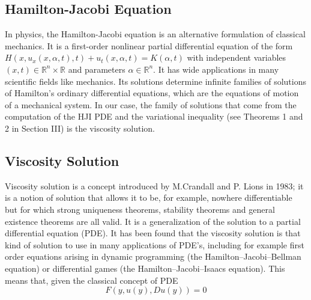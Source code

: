 \begin{comment}
So we want to pass from a game of kind in which the outcome is a binary value {Win = 1, Loss = 0} for Player 1 to a game of degree in which the outcome is a value in the real space for Player 1 that can give us information about the final result of the game. A solution to do this transformation is the level set method that will be discussed in section 2.5.  
The BRS, as said in previous section, comes from the solution of a differential game; more precisely, the lower value function V(t,x) (see “Level Set Method” section) is the viscosity solution of a Hamilton-Jacobi-Isaacs (HJI) partial differential equation (PDE) whose the concepts are explained better in the next sections. 
\end{comment}

\subsection{Hamilton-Jacobi Equation}					
In physics, the Hamilton-Jacobi equation is an alternative formulation of classical mechanics. It is a first-order nonlinear partial differential equation of the form $H(x,u_x(x,\alpha,t),t)+u_t(x,\alpha,t)=K(\alpha,t)$ with independent variables $(x,t)\in \mathbb{R}^n \times \mathbb{R}$ and parameters $\alpha \in \mathbb{R}^n$. It has wide applications in many scientific fields like mechanics. Its solutions determine infinite families of solutions of Hamilton's ordinary differential equations, which are the equations of motion of a mechanical system. In our case, the family of solutions that come from the computation of the HJI PDE and the variational inequality (see Theorems 1 and 2 in Section III) is the viscosity solution. 

\subsection{Viscosity Solution}

Viscosity solution is a concept introduced by M.Crandall and P. Lions in 1983; it is a notion of solution that allows it to be, for example, nowhere differentiable but for which strong uniqueness theorems, stability theorems and general existence theorems are all valid. It is a generalization of the solution to a partial differential equation (PDE). It has been found that the viscosity solution is that kind of solution to use in many applications of PDE's, including for example first order equations arising in dynamic programming (the Hamilton–Jacobi–Bellman equation) or differential games (the Hamilton–Jacobi–Isaacs equation). This means that, given the classical concept of PDE 
\begin{equation}
	F(y,u(y), Du(y))=0
\end{equation}

